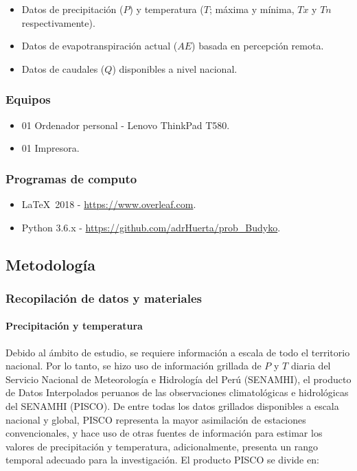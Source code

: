 \documentclass[12pt]{article}
\begin{document}
\begin{itemize}
  
  \item Datos de precipitación ($P$) y temperatura ($T$; máxima y mínima, $Tx$ y $Tn$ respectivamente).
  
  \item Datos de evapotranspiración actual ($AE$) basada en percepción remota.
  
  \item Datos de caudales ($Q$) disponibles a nivel nacional.

\end{itemize}

\subsubsection{Equipos}

\begin{itemize}
  \item 01 Ordenador personal - Lenovo ThinkPad T580.
  \item 01 Impresora.
\end{itemize}

\subsubsection{Programas de computo}

\begin{itemize}
  \item \LaTeX\  2018 - \url{https://www.overleaf.com}.
  \item Python 3.6.x - \url{https://github.com/adrHuerta/prob_Budyko}.
\end{itemize}

\subsection{Metodología}

\subsubsection{Recopilación de datos y materiales}

\paragraph{Precipitación y temperatura}\mbox{}

Debido al ámbito de estudio, se requiere información a escala de todo el territorio nacional. Por lo tanto, se hizo uso de información grillada de $P$ y $T$ diaria del Servicio Nacional de Meteorología e Hidrología del Perú (SENAMHI), el producto de Datos Interpolados peruanos de las observaciones climatológicas e hidrológicas del SENAMHI (PISCO). De entre todas los datos grillados disponibles a escala nacional y global, PISCO representa la mayor asimilación de estaciones convencionales, y hace uso de otras fuentes de información para estimar los valores de precipitación y temperatura, adicionalmente, presenta un rango temporal adecuado para la investigación. El producto PISCO se divide en:
\end{document}
